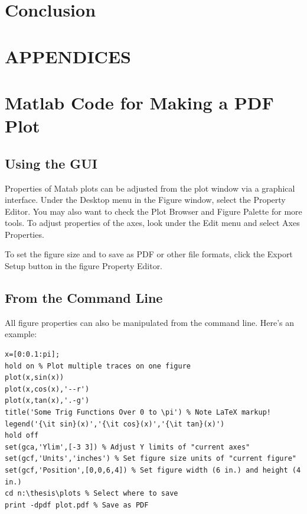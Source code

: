 \documentclass[letterpaper,12pt,titlepage,oneside,final]{book}
\begin{document}
\chapter{Conclusion}

\appendix

\chapter*{APPENDICES}
\chapter[PDF Plots From Matlab]{Matlab Code for Making a PDF Plot}
\label{AppendixA}
\section{Using the GUI}
Properties of Matab plots can be adjusted from the plot window via a graphical interface. Under the Desktop menu in the Figure window, select the Property Editor. You may also want to check the Plot Browser and Figure Palette for more tools. To adjust properties of the axes, look under the Edit menu and select Axes Properties.

To set the figure size and to save as PDF or other file formats, click the Export Setup button in the figure Property Editor.

\section{From the Command Line} 
All figure properties can also be manipulated from the command line. Here's an example: 
\begin{verbatim}
x=[0:0.1:pi];
hold on % Plot multiple traces on one figure
plot(x,sin(x))
plot(x,cos(x),'--r')
plot(x,tan(x),'.-g')
title('Some Trig Functions Over 0 to \pi') % Note LaTeX markup!
legend('{\it sin}(x)','{\it cos}(x)','{\it tan}(x)')
hold off
set(gca,'Ylim',[-3 3]) % Adjust Y limits of "current axes"
set(gcf,'Units','inches') % Set figure size units of "current figure"
set(gcf,'Position',[0,0,6,4]) % Set figure width (6 in.) and height (4 in.)
cd n:\thesis\plots % Select where to save
print -dpdf plot.pdf % Save as PDF
\end{verbatim}
\end{document}
